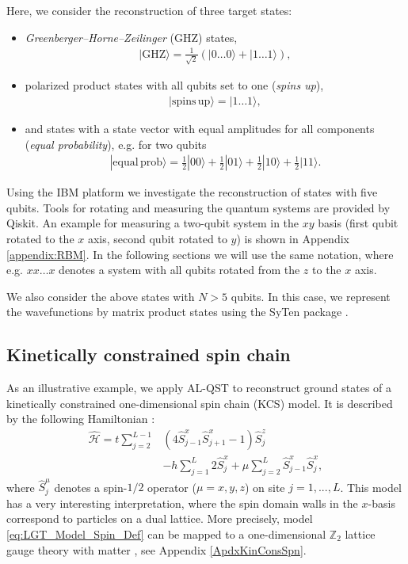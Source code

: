 \documentclass[pra,aps,showpacs,groupedaddress,superscriptaddress,twocolumn,toc=flat,biblatex,footinbib]{revtex4-1}
\renewcommand{\l}{\left(}
\renewcommand{\r}{\right)}
\newcommand{\ket}[1]{|#1\rangle}
\renewcommand{\H}{\hat{\mathcal{H}}}
\newcommand{\Zt}{$\mathbb{Z}_2$ }
\begin{document}
Here, we consider the reconstruction of three target states:
\begin{itemize}
\item \textit{Greenberger–Horne–Zeilinger} (GHZ) states, 
    \begin{align}
    \ket{\mathrm{GHZ}} = \frac{1}{\sqrt{2}} \left(\ket{0\dots 0} + \ket{1\dots 1} \right),
    \label{eq:State1}
    \end{align} 
\item polarized product states with all qubits set to one (\textit{spins up}),
\begin{align}
    \ket{\mathrm{spins}\,\mathrm{up}} = \ket{1\dots 1},
    \label{eq:State2}
\end{align}
\item and states with a state vector with equal amplitudes for all components (\textit{equal probability}), e.g. for two qubits
\begin{align}
    \ket{\mathrm{equal}\,\mathrm{prob}} = \frac{1}{2} \ket{00}+  \frac{1}{2} \ket{01} +  \frac{1}{2}   \ket{10} +  \frac{1}{2}  \ket{11}.
    \label{eq:State3}
\end{align}
\end{itemize}

Using the IBM platform we investigate the reconstruction of states with five qubits. Tools for rotating and measuring the quantum systems are provided by Qiskit. An example for measuring a two-qubit system in the $xy$ basis (first qubit rotated to the $x$ axis, second qubit rotated to $y$) is shown in Appendix \ref{appendix:RBM}. In the following sections we will use the same notation, where e.g. $xx\dots x$ denotes a system with all qubits rotated from the $z$ to the $x$ axis.

We also consider the above states with $N>5$ qubits. In this case, we represent the wavefunctions by matrix product states using the SyTen package \cite{syten1,syten2}.

\subsection{Kinetically constrained spin chain}
As an illustrative example, we apply AL-QST to reconstruct ground states of a kinetically constrained one-dimensional spin chain (KCS) model. It is described by the following Hamiltonian \cite{Iadecola2020,Borla2020,Kebric2021}:
\begin{align}
    \H = t \sum_{j=2}^{L-1} &\l 4 \hat{S}^{x}_{j-1} \hat{S}^{x}_{j+1} - 1 \r \hat{S}^{z}_j \nonumber \\
    &- h \sum_{j=1}^{L} 2 \hat{S}^{x}_{j}
    + \mu \sum_{j=2}^{L} \hat{S}^{x}_{j-1} \hat{S}^{x}_{j},
    \label{eq:LGT_Model_Spin_Def}
\end{align}
where $\hat{S}^\mu_j$ denotes a spin-$1/2$ operator ($\mu=x,y,z$) on site $j=1,...,L$. This model has a very interesting interpretation, where the spin domain walls in the $x$-basis correspond to particles on a dual lattice.
More precisely, model \eqref{eq:LGT_Model_Spin_Def} can be mapped to a one-dimensional \Zt lattice gauge theory with matter \cite{Borla2020}, see Appendix \ref{ApdxKinConsSpn}.
\end{document}
